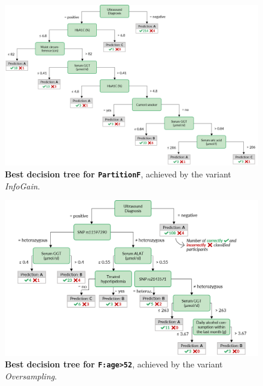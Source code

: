\documentclass[
  oneside]{book}
\begin{document}
\begin{figure}[h]

{\centering \includegraphics[width=1\linewidth]{figures/03-tree-women} 

}

\caption{\textbf{Best decision tree for \texttt{PartitionF}}, achieved by the variant \emph{InfoGain}.}\label{fig:03-tree-women}
\end{figure}



\begin{figure}[h]

{\centering \includegraphics[width=1\linewidth]{figures/03-tree-menopause} 

}

\caption{\textbf{Best decision tree for \texttt{F:age\textgreater{}52}}, achieved by the variant \emph{Oversampling}.}\label{fig:03-tree-menopause}
\end{figure}
\end{document}
